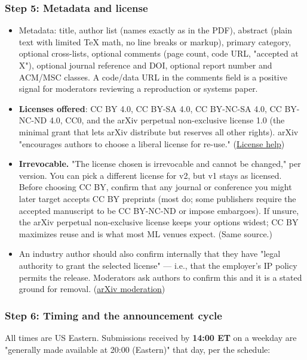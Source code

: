 \documentclass[twocolumn,10pt,letterpaper]{article}
\begin{document}
\subsubsection{Step 5: Metadata and license}

\begin{itemize}
\setlength{\itemsep}{0pt}
\setlength{\parskip}{0pt}
  \item Metadata: title, author list (names exactly as in the PDF), abstract (plain text with limited TeX math, no line breaks or markup), primary category, optional cross-lists, optional comments (page count, code URL, "accepted at X"), optional journal reference and DOI, optional report number and ACM/MSC classes. A code/data URL in the comments field is a positive signal for moderators reviewing a reproduction or systems paper.
  \item \textbf{Licenses offered}: CC BY 4.0, CC BY-SA 4.0, CC BY-NC-SA 4.0, CC BY-NC-ND 4.0, CC0, and the arXiv perpetual non-exclusive license 1.0 (the minimal grant that lets arXiv distribute but reserves all other rights). arXiv "encourages authors to choose a liberal license for re-use." (\href{https://info.arxiv.org/help/license/index.html}{License help})
  \item \textbf{Irrevocable.} "The license chosen is irrevocable and cannot be changed," per version. You can pick a different license for v2, but v1 stays as licensed. Before choosing CC BY, confirm that any journal or conference you might later target accepts CC BY preprints (most do; some publishers require the accepted manuscript to be CC BY-NC-ND or impose embargoes). If unsure, the arXiv perpetual non-exclusive license keeps your options widest; CC BY maximizes reuse and is what most ML venues expect. (Same source.)
  \item An industry author should also confirm internally that they have "legal authority to grant the selected license" — i.e., that the employer's IP policy permits the release. Moderators ask authors to confirm this and it is a stated ground for removal. (\href{https://info.arxiv.org/help/moderation/index.html}{arXiv moderation})
\end{itemize}

\subsubsection{Step 6: Timing and the announcement cycle}

All times are US Eastern. Submissions received by \textbf{14:00 ET} on a weekday are "generally made available at 20:00 (Eastern)" that day, per the schedule:
\end{document}
